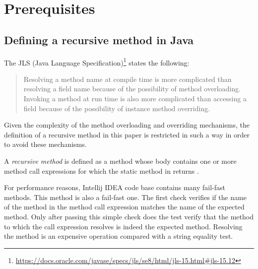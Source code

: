 \chapter{Prerequisites}

\section{Defining a recursive method in Java}

The JLS (Java Language Specification)\nocite{jls}\footnote{\url{https://docs.oracle.com/javase/specs/jls/se8/html/jls-15.html#jls-15.12}}
states the following:
\begin{quote}
    Resolving a method name at compile time is more complicated than resolving a field name because of the possibility
    of method overloading. Invoking a method at run time is also more complicated than accessing a field because of the
    possibility of instance method overriding.
\end{quote}
Given the complexity of the method overloading and overriding mechanisms, the definition of a recursive method in this
paper is restricted in such a way in order to avoid these mechanisms.

A \textit{recursive method} is defined as a method whose body contains one or more method call expressions for which the
static method in  returns .


For performance reasons, Intellij IDEA code base contains many fail-fast methods. This method is also a fail-fast one.
The first check verifies if the name of the method in the method call expression matches the name of the expected
method. Only after passing this simple check does the test verify that the method to which the call expression resolves
is indeed the expected method. Resolving the method is an expensive operation compared with a string equality test.

